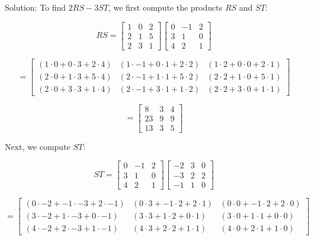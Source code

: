 \begin{solution}

    Solution: To find $2RS - 3ST$, we first compute the products $RS$ and $ST$:

    \[
        RS = \begin{bmatrix} 1 & 0 & 2 \\ 2 & 1 & 5 \\ 2 & 3 & 1 \end{bmatrix} \begin{bmatrix} 0 & -1 & 2 \\ 3 & 1 & 0 \\ 4 & 2 & 1 \end{bmatrix}
    \]

    \[
        = \begin{bmatrix} (1 \cdot 0 + 0 \cdot 3 + 2 \cdot 4) & (1 \cdot -1 + 0 \cdot 1 + 2 \cdot 2) & (1 \cdot 2 + 0 \cdot 0 + 2 \cdot 1) \\ (2 \cdot 0 + 1 \cdot 3 + 5 \cdot 4) & (2 \cdot -1 + 1 \cdot 1 + 5 \cdot 2) & (2 \cdot 2 + 1 \cdot 0 + 5 \cdot 1) \\ (2 \cdot 0 + 3 \cdot 3 + 1 \cdot 4) & (2 \cdot -1 + 3 \cdot 1 + 1 \cdot 2) & (2 \cdot 2 + 3 \cdot 0 + 1 \cdot 1) \end{bmatrix}
    \]

    \[
        = \begin{bmatrix} 8 & 3 & 4 \\ 23 & 9 & 9 \\ 13 & 3 & 5 \end{bmatrix}
    \]

    Next, we compute $ST$:

    \[
        ST = \begin{bmatrix} 0 & -1 & 2 \\ 3 & 1 & 0 \\ 4 & 2 & 1 \end{bmatrix} \begin{bmatrix} -2 & 3 & 0 \\ -3 & 2 & 2 \\ -1 & 1 & 0 \end{bmatrix}
    \]

    \[
        = \begin{bmatrix} (0 \cdot -2 + -1 \cdot -3 + 2 \cdot -1) & (0 \cdot 3 + -1 \cdot 2 + 2 \cdot 1) & (0 \cdot 0 + -1 \cdot 2 + 2 \cdot 0) \\ (3 \cdot -2 + 1 \cdot -3 + 0 \cdot -1) & (3 \cdot 3 + 1 \cdot 2 + 0 \cdot 1) & (3 \cdot 0 + 1 \cdot 1 + 0 \cdot 0) \\ (4 \cdot -2 + 2 \cdot -3 + 1 \cdot -1) & (4 \cdot 3 + 2 \cdot 2 + 1 \cdot 1) & (4 \cdot 0 + 2 \cdot 1 + 1 \cdot 0) \end{bmatrix}
    \]


\end{solution}
